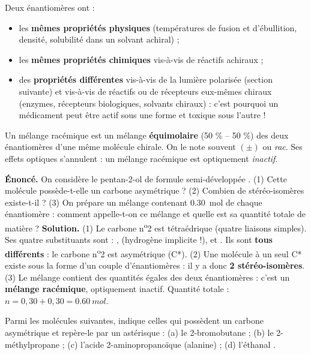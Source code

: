 \documentclass[11pt]{article}
\newcommand{\cle}[1]{{\popxbold\color{popdark}#1}}
\begin{document}
\begin{aretenir}
Deux énantiomères ont :
\begin{itemize}
\item les \textbf{mêmes propriétés physiques} (températures de fusion et d'ébullition, densité, solubilité dans un solvant achiral) ;
\item les \textbf{mêmes propriétés chimiques} vis-à-vis de réactifs achiraux ;
\item des \textbf{propriétés différentes} vis-à-vis de la lumière polarisée (section suivante) et vis-à-vis de réactifs ou de récepteurs eux-mêmes chiraux (enzymes, récepteurs biologiques, solvants chiraux) : c'est pourquoi un médicament peut être actif sous une forme et toxique sous l'autre !
\end{itemize}
\end{aretenir}

\begin{definition}
Un \cle{mélange racémique} est un mélange \textbf{équimolaire} (50 \% -- 50 \%) des deux énantiomères d'une même molécule chirale. On le note souvent $(\pm)$ ou \emph{rac}. Ses effets optiques s'annulent : un mélange racémique est optiquement \emph{inactif}.
\end{definition}

\begin{exoresolu}
\textbf{Énoncé.} On considère le pentan-2-ol de formule semi-développée . (1) Cette molécule possède-t-elle un carbone asymétrique ? (2) Combien de stéréo-isomères existe-t-il ? (3) On prépare un mélange contenant \SI{0,30}{mol} de chaque énantiomère : comment appelle-t-on ce mélange et quelle est sa quantité totale de matière ?
\tcblower
\textbf{Solution.} (1) Le carbone n\textsuperscript{o}2 est tétraédrique (quatre liaisons simples). Ses quatre substituants sont : ,  (hydrogène implicite !),  et . Ils sont \textbf{tous différents} : le carbone n\textsuperscript{o}2 est asymétrique (C*). (2) Une molécule à un seul C* existe sous la forme d'un couple d'énantiomères : il y a donc \textbf{2 stéréo-isomères}. (3) Le mélange contient des quantités égales des deux énantiomères : c'est un \textbf{mélange racémique}, optiquement inactif. Quantité totale : $n = 0{,}30 + 0{,}30 = \SI{0,60}{mol}$.
\end{exoresolu}

\begin{exercice}
Parmi les molécules suivantes, indique celles qui possèdent un carbone asymétrique et repère-le par un astérisque : (a) le 2-bromobutane  ; (b) le 2-méthylpropane  ; (c) l'acide 2-aminopropanoïque (alanine)  ; (d) l'éthanal .
\end{exercice}
\end{document}
